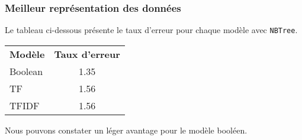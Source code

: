 \subsubsection{Meilleur représentation des données}

Le tableau ci-dessous présente le taux d'erreur pour chaque modèle avec \texttt{NBTree}.

\begin{tabular}{l c} 
\textbf{Modèle} & \textbf{Taux d'erreur}\\
Boolean & 1.35\\
TF & 1.56\\
TFIDF & 1.56\\
\end{tabular}

Nous pouvons constater un léger avantage pour le modèle booléen. 




